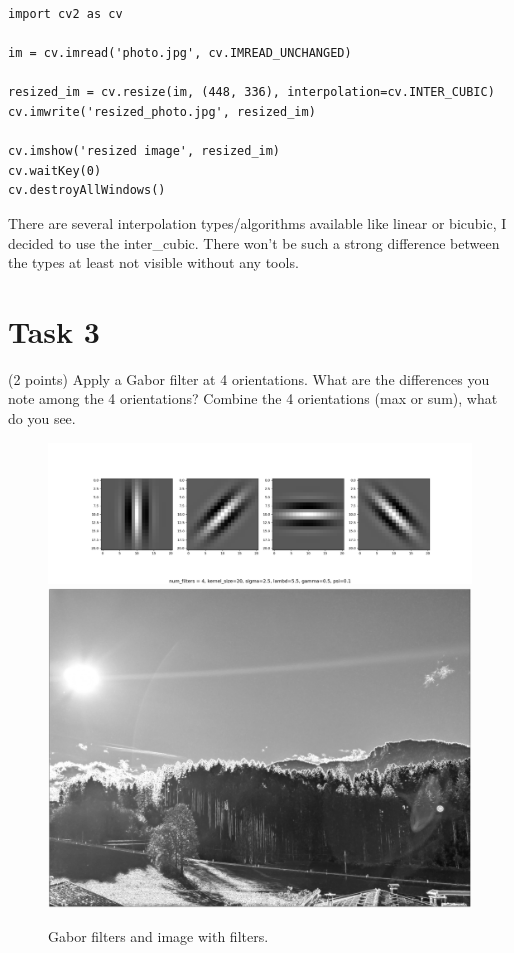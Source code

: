 \documentclass[UTF-8]{article}
\begin{document}
\begin{lstlisting}
import cv2 as cv

im = cv.imread('photo.jpg', cv.IMREAD_UNCHANGED)

resized_im = cv.resize(im, (448, 336), interpolation=cv.INTER_CUBIC)
cv.imwrite('resized_photo.jpg', resized_im)

cv.imshow('resized image', resized_im)
cv.waitKey(0)
cv.destroyAllWindows()
\end{lstlisting}

There are several interpolation types/algorithms available like linear or bicubic, I decided to use the inter\_cubic. There won't be such a strong difference between the types at least not visible without any tools.
\newpage
\section*{Task 3}
(2 points) Apply a Gabor filter at 4 orientations. What are the differences you note among the
4 orientations? Combine the 4 orientations (max or sum), what do you see.
\begin{figure}[H]
	\centering
	\includegraphics[width=0.7\linewidth]{gabor1}
	\includegraphics[width=0.7\linewidth]{gabor2}
	\caption{Gabor filters and image with filters.}
	\label{fig:gabor1}
\end{figure}
\end{document}
